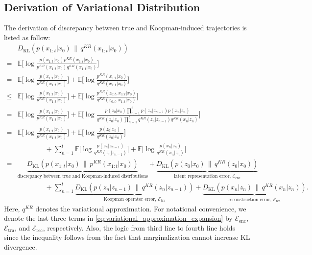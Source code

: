\documentclass{article} %
\begin{document}
\subsection{Derivation of Variational Distribution} \label{claim:derivation_of_variational_distribution}
The derivation of discrepancy between true and Koopman-induced trajectories is listed as follow:
\begin{equation} \label{eq:variational_approximation_expansion}
\begin{aligned}
    & D_{\mathrm{KL}} \left( p(x_{1:t} | x_0) \,\|\, q^{KR}(x_{1:t} | x_0) \right)  \\
     = & \mathbb{E} \big[ \log \frac{ p(x_{1:t} |x_0) p^{KR}(x_{1:t} | x_0) }{p^{KR}(x_{1:t} | x_0) q^{KR}(x_{1:t} | x_0)} \big] \\
     = & \mathbb{E} \big[ \log \frac{ p(x_{1:t} |x_0)}{p^{KR}(x_{1:t} | x_0)} \big] +   \mathbb{E} \big[ \log \frac{ p^{KR} (x_{1:t} |x_0)}{q^{KR}(x_{1:t} | x_0)} \big] \\
     \leq & \mathbb{E} \big[ \log \frac{ p(x_{1:t} |x_0)}{p^{KR}(x_{1:t} | x_0)} \big] +  \mathbb{E} \big[ \log \frac{ p^{KR} ( z_{0:t}, x_{1:t} |x_0)}{q^{KR}(z_{0:t}, x_{1:t} | x_0)} \big]  \\
     = &  \mathbb{E} \big[ \log \frac{ p(x_{1:t} |x_0)}{p^{KR}(x_{1:t} | x_0)} \big] +  \mathbb{E} \big[ \log \frac{ p(z_0|x_0)  \prod_{n =1}^t p(z_{n}|z_{n-1}) p(x_{n}|z_{n}) }{q^{KR}(z_0|x_0)  \prod_{n =1}^t q^{KR}(z_{n}|z_{n-1}) q^{KR}(x_{n}|z_{n})} \big]  \\
     =&  \mathbb{E} \big[ \log \frac{ p(x_{1:t} |x_0)}{p^{KR}(x_{1:t} | x_0)} \big] + \mathbb{E}\big[ \log \frac{p(z_0|x_0)}{q^{KR}(z_0|x_0)}\big] \\
     & \qquad \qquad +  \sum_{n=1}^{t}  \mathbb{E} \big[\log \frac{p(z_{n}|z_{n-1})}{q^{KR}(z_{n}|z_{n-1})} \big] + \mathbb{E} \big[ \log \frac{p(x_n|z_n)}{q^{KR}(x_n|z_n)} \big] \\
     = & \underbrace{D_{\mathrm{KL}} \left( p(x_{1:t} | x_0) \,\|\, p^{KR}(x_{1:t} | x_0) \right)}_{\text{discrepancy between true and Koopman-induced distributions}} + \underbrace{D_{\mathrm{KL}} \left( p(z_0 | x_0) \,\|\, q^{KR}(z_0 | x_0) \right)}_{\text{latent representation error, $\mathcal{E}_{\text{enc}}$}} \\
      & \qquad \qquad + \sum_{n=1}^{t} \underbrace{ D_{\mathrm{KL}} \left( p(z_n | z_{n-1}) \,\|\, q^{KR}(z_n | z_{n-1}) \right)}_{\text{Koopman operator error, $\mathcal{E}_{\text{tra}}$}} + \underbrace{D_{\mathrm{KL}} \left( p(x_n | z_{n}) \,\|\, q^{KR}(x_n | z_{n}) \right)}_{\text{reconstruction error, $\mathcal{E}_{\text{rec}}$}}. 
\end{aligned}
\end{equation}
Here, $q^{KR}$ denotes the variational approximation. For notational convenience, we denote the last three terms in \eqref{eq:variational_approximation_expansion} by $\mathcal{E}_{\text{enc}}$, $\mathcal{E}_{\text{tra}}$, and $\mathcal{E}_{\text{rec}}$, respectively. Also, the logic from third line to fourth line holds since the inequality follows from the fact that marginalization cannot increase KL divergence. 
\end{document}
